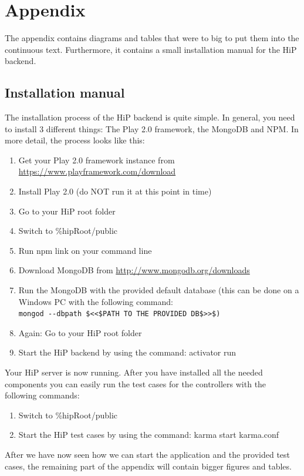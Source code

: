 \chapter{Appendix}
The appendix contains diagrams and tables that were to big to put them into the continuous text. Furthermore, it contains a small installation manual for the \ac{HiP} backend.

\section{Installation manual}
The installation process of the \ac{HiP} backend is quite simple. In general, you need to install 3 different things: The Play 2.0 framework, the MongoDB and \ac{NPM}. In more detail, the process looks like this:

\begin{enumerate}
	\item Get your Play 2.0 framework instance from \url{https://www.playframework.com/download}
	\item Install Play 2.0 (do NOT run it at this point in time)
	\item Go to your \ac{HiP} root folder
	\item Switch to \%hipRoot/public
	\item Run npm link on your command line
	\item Download MongoDB from \url{http://www.mongodb.org/downloads}
	\item Run the MongoDB with the provided default database (this can be done on a Windows PC with the following command: \\ \verb|mongod --dbpath $<<$PATH TO THE PROVIDED DB$>>$)|
	\item Again: Go to your \ac{HiP} root folder
	\item	Start the \ac{HiP} backend by using the command: activator run
\end{enumerate}

Your \ac{HiP} server is now running. After you have installed all the needed components you can easily run the test cases for the controllers with the following commands:

\begin{enumerate}
	\item Switch to \%hipRoot/public
	\item	Start the \ac{HiP} test cases by using the command: karma start karma.conf
\end{enumerate}

After we have now seen how we can start the application and the provided test cases, the remaining part of the appendix will contain bigger figures and tables.


